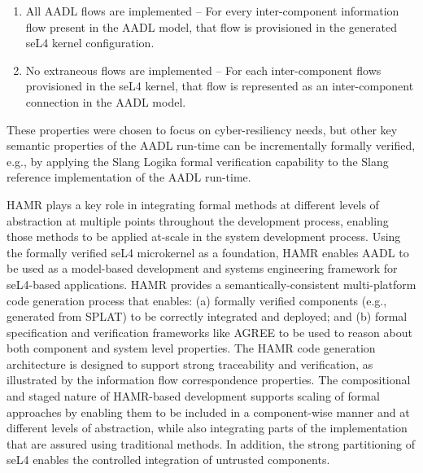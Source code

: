 \begin{enumerate}
\item All AADL flows are implemented -- For every inter-component information
flow present in the AADL model, that flow is provisioned in the
generated seL4 kernel configuration.
\item No extraneous flows are implemented -- For
each inter-component flows provisioned in the seL4 kernel, that
flow is represented as an inter-component connection in the
AADL model.   
\end{enumerate}
These properties were chosen to focus on
cyber-resiliency needs, but other
key semantic properties of the AADL run-time can be incrementally
formally verified, e.g., by applying the Slang Logika formal
verification capability to the Slang reference implementation of the
AADL run-time.  

HAMR plays a key role in integrating formal methods
at different levels of abstraction at multiple points throughout
the development process, enabling those methods to be applied
at-scale in the system development process.   Using the
formally verified seL4 microkernel as a foundation, HAMR enables
AADL to be used as a model-based development and systems
engineering framework for seL4-based applications.
HAMR provides a semantically-consistent multi-platform code
generation process that enables: (a) formally verified components
(e.g., generated from SPLAT) to be correctly integrated and
deployed; and (b) formal specification and verification frameworks
like AGREE to be used to reason about both component and system
level properties.   The HAMR code generation architecture is
designed to support strong traceability and verification, as
illustrated by the information flow correspondence properties.  
The compositional and staged nature
of HAMR-based development supports scaling of formal approaches
by enabling them to be included in a component-wise manner and at
different levels of abstraction, while
also integrating parts of the implementation that are assured
using traditional methods.   In addition, the strong partitioning
of seL4 enables the controlled integration of untrusted components.



